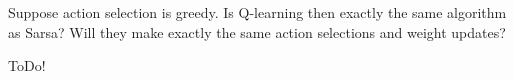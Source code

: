 
\begin{exercise}[Exercise 6.12]

Suppose action selection is greedy.
Is Q-learning then exactly the same algorithm as Sarsa?
Will they make exactly the same action selections and weight updates?

\end{exercise}


\begin{solution}

ToDo!

\end{solution}

